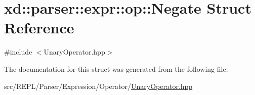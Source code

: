 \hypertarget{structxd_1_1parser_1_1expr_1_1op_1_1_negate}{}\section{xd\+:\+:parser\+:\+:expr\+:\+:op\+:\+:Negate Struct Reference}
\label{structxd_1_1parser_1_1expr_1_1op_1_1_negate}


{\ttfamily \#include $<$Unary\+Operator.\+hpp$>$}



The documentation for this struct was generated from the following file\+:\begin{DoxyCompactItemize}
\item 
src/\+R\+E\+P\+L/\+Parser/\+Expression/\+Operator/\mbox{\hyperlink{_unary_operator_8hpp}{Unary\+Operator.\+hpp}}\end{DoxyCompactItemize}
